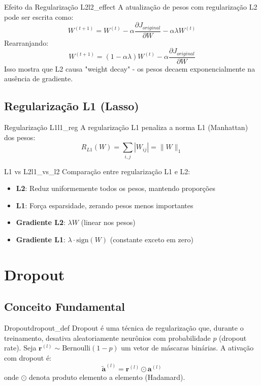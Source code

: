 \documentclass[a4paper,12pt]{article}
\newcommand{\grad}[2]{\frac{\partial #1}{\partial #2}}
\begin{document}
\begin{teorema}{Efeito da Regularização L2}{l2_effect}
A atualização de pesos com regularização L2 pode ser escrita como:
\[
W^{(t+1)} = W^{(t)} - \alpha \grad{J_{original}}{W} - \alpha \lambda W^{(t)}
\]
Rearranjando:
\[
W^{(t+1)} = (1 - \alpha \lambda) W^{(t)} - \alpha \grad{J_{original}}{W}
\]
Isso mostra que L2 causa "weight decay" - os pesos decaem exponencialmente na ausência de gradiente.
\end{teorema}

\subsection{Regularização L1 (Lasso)}

\begin{definicao}{Regularização L1}{l1_reg}
A regularização L1 penaliza a norma L1 (Manhattan) dos pesos:
\[
R_{L1}(W) = \sum_{i,j} |W_{ij}| = \|W\|_1
\]
\end{definicao}

\begin{observacao}{L1 vs L2}{l1_vs_l2}
Comparação entre regularização L1 e L2:
\begin{itemize}
    \item \textbf{L2}: Reduz uniformemente todos os pesos, mantendo proporções
    \item \textbf{L1}: Força esparsidade, zerando pesos menos importantes
    \item \textbf{Gradiente L2}: $\lambda W$ (linear nos pesos)
    \item \textbf{Gradiente L1}: $\lambda \cdot \text{sign}(W)$ (constante exceto em zero)
\end{itemize}
\end{observacao}

\section{Dropout}

\subsection{Conceito Fundamental}

\begin{definicao}{Dropout}{dropout_def}
Dropout é uma técnica de regularização que, durante o treinamento, desativa aleatoriamente neurônios com probabilidade $p$ (dropout rate). Seja $\mathbf{r}^{(l)} \sim \text{Bernoulli}(1-p)$ um vetor de máscaras binárias. A ativação com dropout é:
\[
\tilde{\mathbf{a}}^{(l)} = \mathbf{r}^{(l)} \odot \mathbf{a}^{(l)}
\]
onde $\odot$ denota produto elemento a elemento (Hadamard).
\end{definicao}
\end{document}
